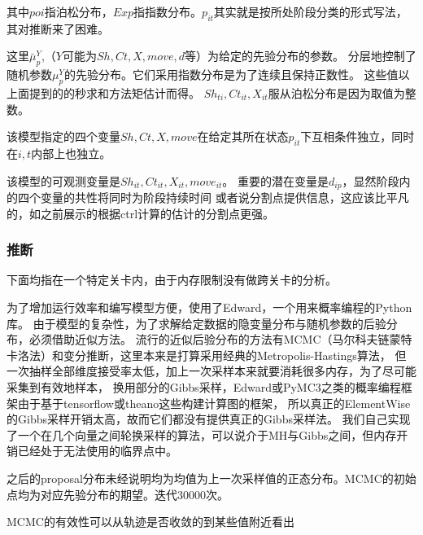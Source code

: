 \documentclass[UTF8]{ctexart}
\begin{document}
其中$poi$指泊松分布，$Exp$指指数分布。$p_{it}$其实就是按所处阶段分类的形式写法，其对推断来了困难。

这里$\bar{\mu}^{Y}_{p}$,（$Y$可能为$Sh,Ct,X,move,d$等）为给定的先验分布的参数。
分层地控制了随机参数$\mu^{Y}_p$的先验分布。它们采用指数分布是为了连续且保持正数性。
这些值以上面提到的的秒求和方法矩估计而得。
$Sh_{ti},Ct_{it},X_{it}$服从泊松分布是因为取值为整数。

该模型指定的四个变量$Sh,Ct,X,move$在给定其所在状态$p_{it}$下互相条件独立，同时在$i,t$内部上也独立。

该模型的可观测变量是$Sh_{it},Ct_{it},X_{it},move_{it}$。
重要的潜在变量是$d_{ip}$，显然阶段内的四个变量的共性将同时为阶段持续时间
或者说分割点提供信息，这应该比平凡的，如之前展示的根据ctrl计算的估计的分割点更强。


\subsubsection{推断}

下面均指在一个特定关卡内，由于内存限制没有做跨关卡的分析。

为了增加运行效率和编写模型方便，使用了Edward，一个用来概率编程的Python库\cite{edward}。
由于模型的复杂性，为了求解给定数据的隐变量分布与随机参数的后验分布，必须借助近似方法。
流行的近似后验分布的方法有MCMC（马尔科夫链蒙特卡洛法）和变分推断，这里本来是打算采用经典的Metropolis-Hastings算法，
\cite{metropolis}
但一次抽样全部维度接受率太低，加上一次采样本来就要消耗很多内存，为了尽可能采集到有效地样本，
换用部分的Gibbs采样\cite{gibbs}，Edward或PyMC3之类的概率编程框架由于基于tensorflow或theano这些构建计算图的框架，
所以真正的ElementWise的Gibbs采样开销太高，故而它们都没有提供真正的Gibbs采样法。
我们自己实现了一个在几个向量之间轮换采样的算法，可以说介于MH与Gibbs之间，但内存开销已经处于无法使用的临界点中。

之后的proposal分布未经说明均为均值为上一次采样值的正态分布。MCMC的初始点均为对应先验分布的期望。迭代30000次。

MCMC的有效性可以从轨迹是否收敛的到某些值附近看出
\end{document}

